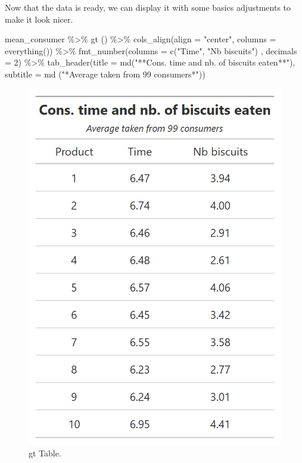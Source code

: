\documentclass[
]{krantz}
\makeatletter
\newenvironment{Shaded}{\begin{snugshade}}{\end{snugshade}}
\newcommand{\AttributeTok}[1]{\textcolor[rgb]{0.61,0.61,0.61}{#1}}
\newcommand{\DecValTok}[1]{\textcolor[rgb]{0.06,0.06,0.06}{#1}}
\newcommand{\FunctionTok}[1]{\textcolor[rgb]{0,0,0}{#1}}
\newcommand{\NormalTok}[1]{#1}
\newcommand{\SpecialCharTok}[1]{\textcolor[rgb]{0,0,0}{#1}}
\newcommand{\StringTok}[1]{\textcolor[rgb]{0.5,0.5,0.5}{#1}}
\newenvironment{kframe}{%
\medskip{}
\setlength{\fboxsep}{.8em}
 \def\at@end@of@kframe{}%
 \ifinner\ifhmode%
  \def\at@end@of@kframe{\end{minipage}}%
  \begin{minipage}{\columnwidth}%
 \fi\fi%
 \def\FrameCommand##1{\hskip\@totalleftmargin \hskip-\fboxsep
 \colorbox{shadecolor}{##1}\hskip-\fboxsep
     \hskip-\linewidth \hskip-\@totalleftmargin \hskip\columnwidth}%
 \MakeFramed {\advance\hsize-\width
   \@totalleftmargin\z@ \linewidth\hsize
   \@setminipage}}%
 {\par\unskip\endMakeFramed%
 \at@end@of@kframe}
\renewenvironment{Shaded}{\begin{kframe}}{\end{kframe}}
\makeatother
\begin{document}
Now that the data is ready, we can display it with some basics adjustments to make it look nicer.

\begin{Shaded}
\begin{Highlighting}[]
\NormalTok{mean\_consumer }\SpecialCharTok{\%\textgreater{}\%}
  \FunctionTok{gt}\NormalTok{ () }\SpecialCharTok{\%\textgreater{}\%}
  \FunctionTok{cols\_align}\NormalTok{(}\AttributeTok{align =} \StringTok{"center"}\NormalTok{, }\AttributeTok{columns =} \FunctionTok{everything}\NormalTok{()) }\SpecialCharTok{\%\textgreater{}\%}
  \FunctionTok{fmt\_number}\NormalTok{(}\AttributeTok{columns =} \FunctionTok{c}\NormalTok{(}\StringTok{"Time"}\NormalTok{, }\StringTok{"Nb biscuits"}\NormalTok{) , }\AttributeTok{decimals =} \DecValTok{2}\NormalTok{) }\SpecialCharTok{\%\textgreater{}\%}
  \FunctionTok{tab\_header}\NormalTok{(}\AttributeTok{title =} \FunctionTok{md}\NormalTok{(}\StringTok{"**Cons. time and nb. of biscuits eaten**"}\NormalTok{), }
             \AttributeTok{subtitle =} \FunctionTok{md}\NormalTok{ (}\StringTok{"*Average taken from 99 consumers*"}\NormalTok{))}
\end{Highlighting}
\end{Shaded}

\begin{figure}

{\centering \includegraphics[width=0.9\linewidth]{images/gt_table} 

}

\caption{gt Table.}\label{fig:gttable}
\end{figure}
\end{document}
